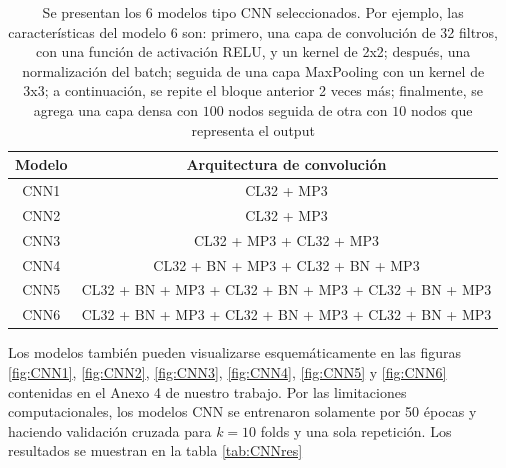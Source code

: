 \documentclass[11pt]{article}
\begin{document}
\begin{table}[htbp]
\begin{center}
\begin{tabular}{c|c}
\toprule
Modelo  &  Arquitectura de convolución  \\
\midrule
 CNN1    & CL32 + MP3    \\ 
 CNN2    & CL32 + MP3   \\ 
 CNN3    & CL32 + MP3 + CL32 + MP3    \\ 
 CNN4    & CL32 + BN + MP3 + CL32 + BN + MP3  \\ 
 CNN5    & CL32 + BN + MP3 + CL32 + BN + MP3 + CL32 + BN + MP3 \\  
 CNN6    & CL32 + BN + MP3 + CL32 + BN + MP3 + CL32 + BN + MP3  \\ 
 \bottomrule
\end{tabular}
\caption{Se presentan los 6 modelos tipo CNN seleccionados. Por ejemplo, las características del modelo 6 son: primero, una capa de convolución de 32 filtros, con una función de activación RELU, y un kernel de 2x2; después, una normalización del batch; seguida de una capa MaxPooling con un kernel de 3x3; a continuación, se repite el bloque anterior 2 veces más;  finalmente, se agrega una capa densa con $100$ nodos seguida de otra con $10$ nodos que representa el output}
\label{tab:CNNconvDes}
\end{center}
\end{table}
Los modelos también pueden visualizarse esquemáticamente en las figuras \ref{fig:CNN1}, \ref{fig:CNN2}, \ref{fig:CNN3}, \ref{fig:CNN4}, \ref{fig:CNN5} y \ref{fig:CNN6} contenidas en el Anexo 4 de nuestro trabajo. Por las limitaciones computacionales, los modelos CNN se entrenaron solamente por 50 épocas y haciendo validación cruzada para $k=10$ folds y una sola repetición. Los resultados se muestran en la tabla \ref{tab:CNNres}
\end{document}
